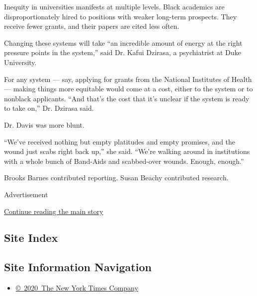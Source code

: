 Inequity in universities manifests at multiple levels. Black academics
are disproportionately hired to positions with weaker long-term
prospects. They receive fewer grants, and their papers are cited less
often.

Changing these systems will take ``an incredible amount of energy at the
right pressure points in the system,'' said Dr. Kafui Dzirasa, a
psychiatrist at Duke University.

For any system --- say, applying for grants from the National Institutes
of Health --- making things more equitable would come at a cost, either
to the system or to nonblack applicants. ``And that's the cost that it's
unclear if the system is ready to take on,'' Dr. Dzirasa said.

Dr. Davis was more blunt.

``We've received nothing but empty platitudes and empty promises, and
the wound just scabs right back up,'' she said. ``We're walking around
in institutions with a whole bunch of Band-Aids and scabbed-over wounds.
Enough, enough.''

Brooks Barnes contributed reporting. Susan Beachy contributed research.

Advertisement

\protect\hyperlink{after-bottom}{Continue reading the main story}

\hypertarget{site-index}{%
\subsection{Site Index}\label{site-index}}

\hypertarget{site-information-navigation}{%
\subsection{Site Information
Navigation}\label{site-information-navigation}}

\begin{itemize}
\tightlist
\item
  \href{https://help.nytimes.com/hc/en-us/articles/115014792127-Copyright-notice}{©~2020~The
  New York Times Company}
\end{itemize}

